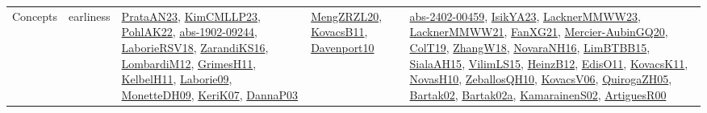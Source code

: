 {\begin{longtable}{lp{3cm}>{\raggedright}p{6cm}>{\raggedright}p{6cm}p{8cm}}
Concepts & earliness & \href{articles/PrataAN23.pdf}{PrataAN23}\cite{PrataAN23}, \href{papers/KimCMLLP23.pdf}{KimCMLLP23}\cite{KimCMLLP23}, \href{articles/PohlAK22.pdf}{PohlAK22}\cite{PohlAK22}, \href{articles/abs-1902-09244.pdf}{abs-1902-09244}\cite{abs-1902-09244}, \href{articles/LaborieRSV18.pdf}{LaborieRSV18}\cite{LaborieRSV18}, \href{articles/ZarandiKS16.pdf}{ZarandiKS16}\cite{ZarandiKS16}, \href{articles/LombardiM12.pdf}{LombardiM12}\cite{LombardiM12}, \href{papers/GrimesH11.pdf}{GrimesH11}\cite{GrimesH11}, \href{articles/KelbelH11.pdf}{KelbelH11}\cite{KelbelH11}, \href{papers/Laborie09.pdf}{Laborie09}\cite{Laborie09}, \href{papers/MonetteDH09.pdf}{MonetteDH09}\cite{MonetteDH09}, \href{papers/KeriK07.pdf}{KeriK07}\cite{KeriK07}, \href{papers/DannaP03.pdf}{DannaP03}\cite{DannaP03} & \href{articles/MengZRZL20.pdf}{MengZRZL20}\cite{MengZRZL20}, \href{articles/KovacsB11.pdf}{KovacsB11}\cite{KovacsB11}, \href{papers/Davenport10.pdf}{Davenport10}\cite{Davenport10} & \href{articles/abs-2402-00459.pdf}{abs-2402-00459}\cite{abs-2402-00459}, \href{articles/IsikYA23.pdf}{IsikYA23}\cite{IsikYA23}, \href{articles/LacknerMMWW23.pdf}{LacknerMMWW23}\cite{LacknerMMWW23}, \href{papers/LacknerMMWW21.pdf}{LacknerMMWW21}\cite{LacknerMMWW21}, \href{articles/FanXG21.pdf}{FanXG21}\cite{FanXG21}, \href{papers/Mercier-AubinGQ20.pdf}{Mercier-AubinGQ20}\cite{Mercier-AubinGQ20}, \href{papers/ColT19.pdf}{ColT19}\cite{ColT19}, \href{articles/ZhangW18.pdf}{ZhangW18}\cite{ZhangW18}, \href{articles/NovaraNH16.pdf}{NovaraNH16}\cite{NovaraNH16}, \href{papers/LimBTBB15.pdf}{LimBTBB15}\cite{LimBTBB15}, \href{papers/SialaAH15.pdf}{SialaAH15}\cite{SialaAH15}, \href{papers/VilimLS15.pdf}{VilimLS15}\cite{VilimLS15}, \href{papers/HeinzB12.pdf}{HeinzB12}\cite{HeinzB12}, \href{papers/EdisO11.pdf}{EdisO11}\cite{EdisO11}, \href{articles/KovacsK11.pdf}{KovacsK11}\cite{KovacsK11}, \href{articles/NovasH10.pdf}{NovasH10}\cite{NovasH10}, \href{articles/ZeballosQH10.pdf}{ZeballosQH10}\cite{ZeballosQH10}, \href{papers/KovacsV06.pdf}{KovacsV06}\cite{KovacsV06}, \href{papers/QuirogaZH05.pdf}{QuirogaZH05}\cite{QuirogaZH05}, \href{papers/Bartak02.pdf}{Bartak02}\cite{Bartak02}, \href{papers/Bartak02a.pdf}{Bartak02a}\cite{Bartak02a}, \href{papers/KamarainenS02.pdf}{KamarainenS02}\cite{KamarainenS02}, \href{articles/ArtiguesR00.pdf}{ArtiguesR00}\cite{ArtiguesR00}\\

\end{longtable}}
